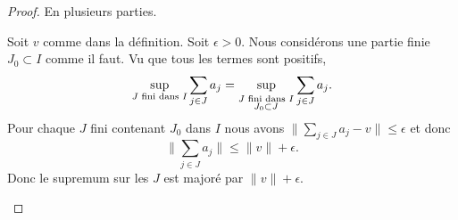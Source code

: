 \begin{proof}
    En plusieurs parties.
    \begin{subproof}
        Soit \( v\) comme dans la définition. Soit \( \epsilon>0\). Nous considérons une partie finie \( J_0\subset I\) comme il faut. Vu que tous les termes sont positifs,
        \begin{equation}
            \sup_{\text{\( J\) fini dans \( I\)}}\sum_{j\in J}a_j=\sup_{_{\substack{\text{\( J\) fini dans \( I\)}\\J_0\subset J}}}\sum_{j\in J}a_j.
        \end{equation}
        Pour chaque \( J\) fini contenant \( J_0\) dans \( I\) nous avons \( \| \sum_{j\in J}a_j-v \|\leq\epsilon\) et donc
        \begin{equation}
            \| \sum_{j\in J}a_j \|\leq \| v \|+\epsilon.
        \end{equation}
        Donc le supremum sur les \( J\) est majoré par \( \| v \|+\epsilon\).


\end{subproof}
\end{proof}
